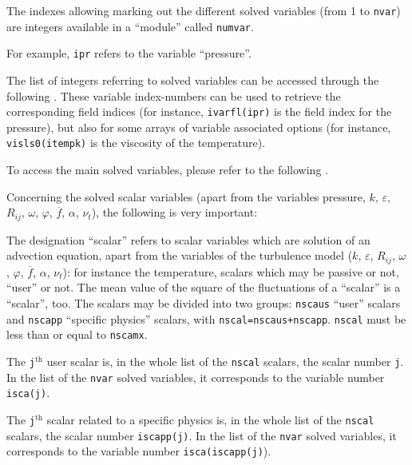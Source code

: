 {{{{The indexes allowing marking out the different solved variables (from 1 to
\texttt{nvar}) are integers available in a ``module'' called
\texttt{numvar}.

For example, \texttt{ipr} refers to the variable ``pressure''.

The list of integers referring to solved variables can be accessed through
the following .
These variable index-numbers can be used to retrieve the corresponding field indices
(for instance, \texttt{ivarfl(ipr)} is the field index for the pressure),
but also for some arrays of variable associated options (for instance,
\texttt{visls0(itempk)} is the viscosity of the temperature).

To access the main solved variables, please refer to the following
.

\bigskip

Concerning the solved scalar variables (apart from the variables
pressure, $k$, $\varepsilon$, $R_{ij}$, $\omega$, $\varphi$,
$\overline{f}$, $\alpha$, $\nu_t$), the following is very important:
\begin{list}{-}{}
\item The designation ``scalar'' refers to scalar variables which are
      solution of an advection equation, apart from the variables of the
      turbulence model  ($k$, $\varepsilon$, $R_{ij}$, $\omega$,
      $\varphi$, $\overline{f}$, $\alpha$, $\nu_t$): for instance the
      temperature, scalars which may be passive or not, ``user'' or not.
      The mean value of the square of the fluctuations of a ``scalar'' is a
      ``scalar'', too. The scalars may be divided into two groups:
      \texttt{nscaus} ``user'' scalars and \texttt{nscapp}
      ``specific physics'' scalars, with \texttt{nscal=nscaus+nscapp}.
      \texttt{nscal} must be less than or equal to \texttt{nscamx}.
\item The \texttt{j}$^{\text{th}}$ user scalar is, in
      the whole list of the \texttt{nscal} scalars, the scalar number
      \texttt{j}. In the list of the \texttt{nvar} solved variables, it
      corresponds to the variable number \texttt{isca(j)}.
\item The \texttt{j}$^{\text{th}}$ scalar related to a specific physics is, in
      the whole list of the \texttt{nscal} scalars, the scalar number
      \texttt{iscapp(j)}. In the list of the \texttt{nvar} solved variables, it
      corresponds to the variable number
      \texttt{isca(iscapp(j)}).


\end{list}}}}}
